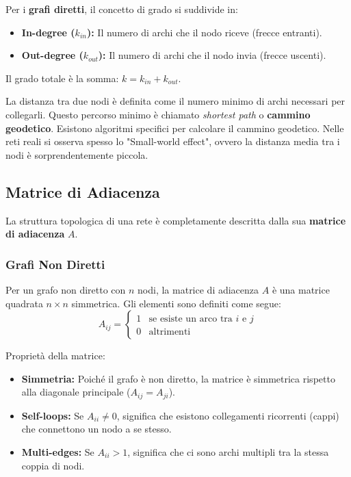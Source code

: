 \noindent Per i \textbf{grafi diretti}, il concetto di grado si suddivide in:
\begin{itemize}
    \item \textbf{In-degree ($k_{in}$):} Il numero di archi che il nodo riceve (frecce entranti).
    \item \textbf{Out-degree ($k_{out}$):} Il numero di archi che il nodo invia (frecce uscenti).
\end{itemize}

Il grado totale è la somma: $k = k_{in} + k_{out}$.

\hfill 

\noindent La distanza tra due nodi è definita come il numero minimo di archi necessari per collegarli. Questo percorso minimo è chiamato \textit{shortest path} o \textbf{cammino geodetico}.
Esistono algoritmi specifici per calcolare il cammino geodetico. Nelle reti reali si osserva spesso lo "Small-world effect", ovvero la distanza media tra i nodi è sorprendentemente piccola.

\subsection{Matrice di Adiacenza}
La struttura topologica di una rete è completamente descritta dalla sua \textbf{matrice di adiacenza} $A$. 

\subsubsection{\textcolor{colorA}{Grafi Non Diretti}}
Per un grafo non diretto con $n$ nodi, la matrice di adiacenza $A$ è una matrice quadrata $n \times n$ simmetrica. Gli elementi sono definiti come segue:
\begin{equation}
A_{ij} = 
\begin{cases} 
1 & \text{se esiste un arco tra } i \text{ e } j \\
0 & \text{altrimenti}
\end{cases}
\end{equation}

\noindent Proprietà della matrice:
\begin{itemize}
    \item \textbf{Simmetria:} Poiché il grafo è non diretto, la matrice è simmetrica rispetto alla diagonale principale ($A_{ij} = A_{ji}$).
    \item \textbf{Self-loops:} Se $A_{ii} \neq 0$, significa che esistono collegamenti ricorrenti (cappi) che connettono un nodo a se stesso.
    \item \textbf{Multi-edges:} Se $A_{ii} > 1$, significa che ci sono archi multipli tra la stessa coppia di nodi.
\end{itemize}

